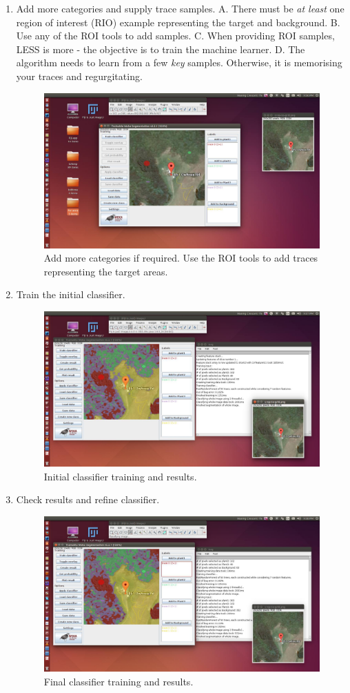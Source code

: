 \documentclass[letterpaper]{article}
\begin{document}
\begin{enumerate}
\clearpage

\item Add more categories and supply trace samples.
\subitem A. There must be \emph{at least} one region of interest (RIO) example representing the target and background.
\subitem B. Use any of the ROI tools to add samples.
\subitem C. When providing ROI samples, LESS is more - the objective is to train the machine learner.
\subitem D. The algorithm needs to learn from a few \emph{key} samples. Otherwise, it is memorising your traces and \subitem regurgitating.

\begin{figure}[htps!]
\centering
\includegraphics[width=0.7\linewidth]{../e-tws/5}
\caption{Add more categories if required. Use the ROI tools to add traces representing the target areas.}
\label{fig:5}
\end{figure}

\item Train the initial classifier.
\begin{figure}[htps!]
\centering
\includegraphics[width=0.7\linewidth]{../e-tws/6}
\caption{Initial classifier training and results.}
\label{fig:6}
\end{figure}

\clearpage

\item Check results and refine classifier.
\begin{figure}[htps!]
\centering
\includegraphics[width=0.7\linewidth]{../e-tws/7}
\caption{Final classifier training and results.}
\label{fig:7}
\end{figure} 


\end{enumerate}
\end{document}
